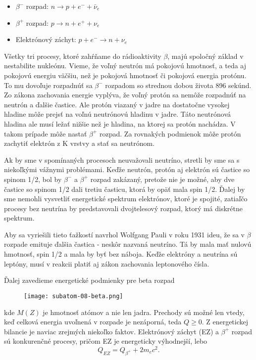 \documentclass[../../main.tex]{subfiles}
\begin{document}
\begin{itemize}
\item $\beta^{-}$ rozpad: $ n \rightarrow p + e^{-} + \bar{\nu}_e$
\item $\beta^{+}$ rozpad: $ p \rightarrow n + e^{+} + \nu_e$
\item Elektrónový záchyt: $ p + e^{-} \rightarrow n + \nu_{e} $ 
\end{itemize}

Všetky tri procesy, ktoré zahŕňame do rádioaktivity $\beta$, majú spoločný základ v nestabilite nukleónu. Vieme, že voľný neutrón má pokojovú hmotnosť, a teda aj pokojovú energiu väčšiu, než je pokojová hmotnosť či pokojová energia protónu. To mu dovoľuje rozpadnúť sa $\beta^-$ rozpadom so strednou dobou života 896 sekúnd. Zo zákona zachovania energie vyplýva, že voľný protón sa nemôže rozpadnúť na neutrón a ďalšie častice. Ale protón viazaný v jadre na dostatočne vysokej hladine môže prejsť na voľnú neutrónovú hladinu v jadre. Táto neutrónová hladina ale musí ležať nižšie než je hladina, na ktorej sa protón nachádza. V takom prípade môže nastať $\beta^+$ rozpad. Za rovnakých podmienok môže protón zachytiť elektrón z K vrstvy a stať sa neutrónom.

Ak by sme v spomínaných procesoch neuvažovali neutríno, stretli by sme sa s niekoľkými vážnymi problémami. Keďže neutrón, protón aj elektrón sú častice so spinom 1/2, bol by $\beta^-$ a $\beta^+$ rozpad zakázaný, pretože nie je možné, aby dve častice so spinom 1/2 dali tretiu časticu, ktorá by opäť mala spin 1/2. Ďalej by sme nemohli vysvetliť energetické spektrum elektrónov, ktoré je spojité, zatiaľčo procesy bez neutrína by predstavovali dvojtelesový rozpad, ktorý má diskrétne spektrum.

Aby sa vyriešili tieto ťažkostí navrhol Wolfgang Pauli v roku 1931 ideu, že sa v $\beta$ rozpade emituje ďalšia častica - neskôr nazvaná neutríno. Tá by mala mať nulovú hmotnosť, spin 1/2 a mala by byť bez náboja. Keďže elektróny a neutrína sú leptóny, musí v reakcii platiť aj zákon zachovania leptonového čísla.

Ďalej zavedieme energetické podmienky pre beta rozpad
\begin{figure}[!h]
\texttt{[image: subatom-08-beta.png]}
\centering
\end{figure}

kde $M(Z)$ je hmotnosť atómov a nie len jadra. Prechody sú možné len vtedy, keď celková energia uvoľnená v rozpade je nezáporná, teda $Q\geq0$. Z energetickej bilancie je naviac zrejmých niekoľko faktov. Elektrónový záchyt (EZ) a $\beta^+$ rozpad sú konkurenčné procesy, pričom EZ je energeticky výhodnejší, lebo
$$ Q_{EZ} = Q_{\beta^+}+2m_{e}c^2.$$
\end{document}
